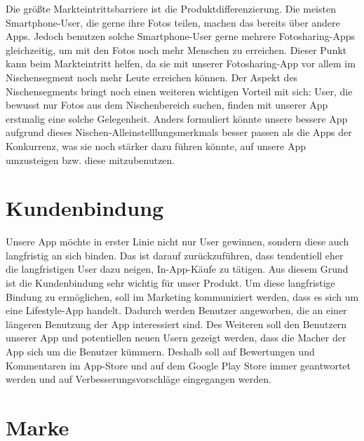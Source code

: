 Die größte Markteintrittsbarriere ist die Produktdifferenzierung. Die meisten Smartphone-User, die gerne ihre Fotos teilen, machen das bereits über andere Apps. Jedoch benutzen solche Smartphone-User gerne mehrere Fotosharing-Apps gleichzeitig, um mit den Fotos noch mehr Menschen zu erreichen. Dieser Punkt kann beim Markteintritt helfen, da sie mit unserer Fotosharing-App vor allem im Nischensegment noch mehr Leute erreichen können. Der Aspekt des Nischensegments bringt noch einen weiteren wichtigen Vorteil mit sich: User, die bewusst nur Fotos aus dem Nischenbereich suchen, finden mit unserer App erstmalig eine solche Gelegenheit. Anders formuliert könnte unsere bessere App aufgrund dieses Nischen-Alleinstelllungsmerkmals besser passen als die Apps der Konkurrenz, was sie noch stärker dazu führen könnte, auf unsere App umzusteigen bzw. diese mitzubenutzen.


\section{Kundenbindung}

Unsere App möchte in erster Linie nicht nur User gewinnen, sondern diese auch langfristig an sich binden. Das ist darauf zurückzuführen, dass tendentiell eher die langfristigen User dazu neigen, In-App-Käufe zu tätigen. Aus diesem Grund ist die Kundenbindung sehr wichtig für unser Produkt. Um diese langfristige Bindung zu ermöglichen, soll im Marketing kommuniziert werden, dass es sich um eine Lifestyle-App handelt. Dadurch werden Benutzer angeworben, die an einer längeren Benutzung der App interessiert sind.
Des Weiteren soll den Benutzern unserer App und potentiellen neuen Usern gezeigt werden, dass die Macher der App sich um die Benutzer kümmern. Deshalb soll auf Bewertungen und Kommentaren im App-Store und auf dem Google Play Store immer geantwortet werden und auf Verbesserungsvorschläge eingegangen werden.

\section{Marke}

